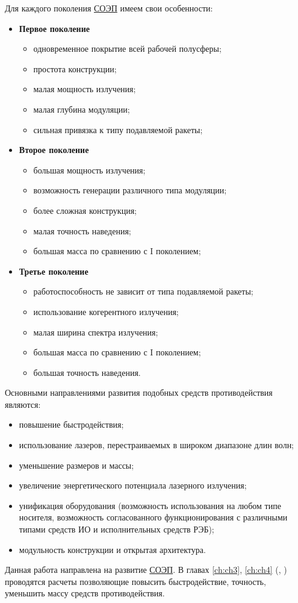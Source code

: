 Для каждого поколения  \hyperref[acroSOEP]{СОЭП} имеем свои особенности:
\begin{itemize}
	\item \textbf{Первое поколение}
	\begin{itemize}
		\item одновременное покрытие всей рабочей полусферы;
		\item простота конструкции;
		\item малая мощность излучения;
		\item малая глубина модуляции;
		\item сильная привязка к типу подавляемой ракеты;
	\end{itemize}
	\item \textbf{Второе поколение}
	\begin{itemize}
		\item большая мощность излучения;
		\item возможность генерации различного типа модуляции;
		\item более сложная конструкция;
		\item малая точность наведения;
		\item большая масса по сравнению с I поколением;
	\end{itemize}
	\item \textbf{Третье поколение}
	\begin{itemize}
		\item работоспособность не зависит от типа подавляемой ракеты;
		\item использование когерентного излучения;
		\item малая ширина спектра излучения;
		\item большая масса по сравнению с I поколением;
		\item большая точность наведения.
	\end{itemize}
\end{itemize}

Основными направлениями развития подобных средств противодействия являются:
\begin{itemize}
	\item повышение быстродействия;
	\item использование лазеров, перестраиваемых в широком диапазоне длин волн;
	\item уменьшение размеров и массы;
	\item увеличение энергетического потенциала лазерного излучения;
	\item унификация оборудования (возможность использования на любом типе носителя, возможность согласованного функционирования с различными типами средств ИО и исполнительных средств РЭБ);
	\item модульность конструкции и открытая архитектура.
\end{itemize}
Данная работа направлена на развитие  \hyperref[acroSOEP]{СОЭП}. В главах \ref{ch:ch3}, \ref{ch:ch4} (, ) проводятся расчеты позволяющие повысить быстродействие, точность, уменьшить массу средств противодействия.

